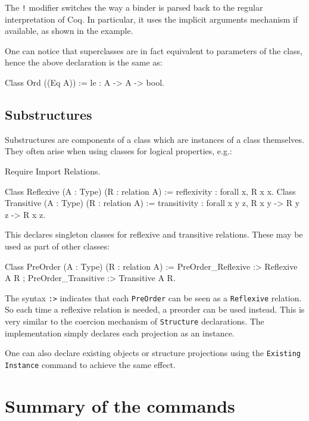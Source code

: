 The \texttt{!} modifier switches the way a binder is parsed back to the
regular interpretation of Coq. In particular, it uses the implicit
arguments mechanism if available, as shown in the example.

One can notice that superclasses are in fact equivalent to parameters of
the class, hence the above declaration is the same as:
\begin{coq_example*}
Class Ord ((Eq A)) := le : A -> A -> bool.
\end{coq_example*}

\subsection{Substructures}

Substructures are components of a class which are instances of a class
themselves. They often arise when using classes for logical properties,
e.g.:

\begin{coq_eval}
Require Import Relations.
\end{coq_eval}
\begin{coq_example*}
Class Reflexive (A : Type) (R : relation A) :=
  reflexivity : forall x, R x x.
Class Transitive (A : Type) (R : relation A) :=
  transitivity : forall x y z, R x y -> R y z -> R x z.
\end{coq_example*}

This declares singleton classes for reflexive and transitive relations. 
These may be used as part of other classes:

\begin{coq_example*}
Class PreOrder (A : Type) (R : relation A) :=
  PreOrder_Reflexive :> Reflexive A R ;
  PreOrder_Transitive :> Transitive A R.
\end{coq_example*}

The syntax \texttt{:>} indicates that each \texttt{PreOrder} can be seen
as a \texttt{Reflexive} relation. So each time a reflexive relation is
needed, a preorder can be used instead. This is very similar to the
coercion mechanism of \texttt{Structure} declarations.
The implementation simply declares each projection as an instance. 

One can also declare existing objects or structure
projections using the \texttt{Existing Instance} command to achieve the 
same effect.

\section{Summary of the commands
\label{TypeClassCommands}}

